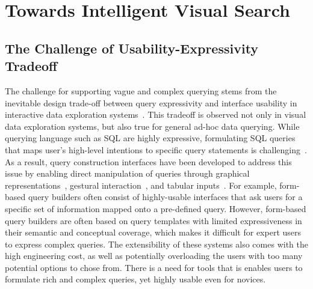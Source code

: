 \section{Towards Intelligent Visual Search\label{sec:vague}}
\subsection{The Challenge of Usability-Expressivity Tradeoff}
\par The challenge for supporting vague and complex querying stems from the inevitable design trade-off between query expressivity and interface usability in interactive data exploration systems~\cite{Jagadish2007,Morton2014}. This tradeoff is observed not only in visual data exploration systems, but also true for general ad-hoc data querying. While querying language such as SQL are highly expressive, formulating SQL queries that maps user's high-level intentions to specific query statements is challenging~\cite{Jagadish2007,Khoussainova2010}. As a result, query construction interfaces have been developed to address this issue by enabling direct manipulation of queries through graphical representations~\cite{Abouzied2012}, gestural interaction~\cite{Nandi2013}, and tabular inputs~\cite{Zloof1975,Embley1989}. For example, form-based query builders often consist of highly-usable interfaces that ask users for a specific set of information mapped onto a pre-defined query. However, form-based query builders are often based on query templates with limited expressiveness in their semantic and conceptual coverage, which makes it difficult for expert users to express complex queries. The extensibility of these systems also comes with the high engineering cost, as well as potentially overloading the users with too many potential options to chose from. There is a need for tools that is enables users to formulate rich and complex queries, yet highly usable even for novices.  

